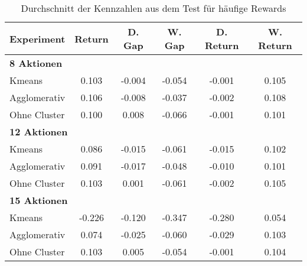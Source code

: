 \begin{table}[ht]
\centering
\caption{Durchschnitt der Kennzahlen aus dem Test für häufige Rewards}
\begin{tabular}{lccccc}
\hline
\textbf{Experiment} & \textbf{Return} & \textbf{D. Gap} & \textbf{W. Gap} & \textbf{D. Return} & \textbf{W. Return} \\
\hline
\multicolumn{6}{l}{\textbf{8 Aktionen}} \\
\hspace{1em}Kmeans & 0.103 & -0.004 & -0.054 & -0.001 & 0.105 \\
\hspace{1em}Agglomerativ & 0.106 & -0.008 & -0.037 & -0.002 & 0.108 \\
\hspace{1em}Ohne Cluster & 0.100 & 0.008 & -0.066 & -0.001 & 0.101 \\
\hline
\multicolumn{6}{l}{\textbf{12 Aktionen}} \\
\hspace{1em}Kmeans & 0.086 & -0.015 & -0.061 & -0.015 & 0.102 \\
\hspace{1em}Agglomerativ & 0.091 & -0.017 & -0.048 & -0.010 & 0.101 \\
\hspace{1em}Ohne Cluster & 0.103 & 0.001 & -0.061 & -0.002 & 0.105 \\
\hline
\multicolumn{6}{l}{\textbf{15 Aktionen}} \\
\hspace{1em}Kmeans & -0.226 & -0.120 & -0.347 & -0.280 & 0.054 \\
\hspace{1em}Agglomerativ & 0.074 & -0.025 & -0.060 & -0.029 & 0.103 \\
\hspace{1em}Ohne Cluster & 0.103 & 0.005 & -0.054 & -0.001 & 0.104 \\
\hline
\end{tabular}
\end{table}


